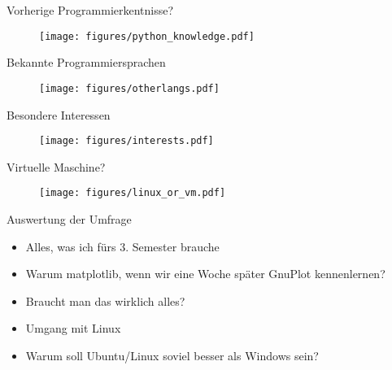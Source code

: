 \begin{frame}{Vorherige Programmierkentnisse?}
    \begin{figure}
        \centering
        \texttt{[image: figures/python\_knowledge.pdf]}
    \end{figure}
\end{frame}
\begin{frame}{Bekannte Programmiersprachen}
    \begin{figure}
        \centering
        \texttt{[image: figures/otherlangs.pdf]}
    \end{figure}
\end{frame}
\begin{frame}{Besondere Interessen}
    \begin{figure}
        \centering
        \texttt{[image: figures/interests.pdf]}
    \end{figure}
\end{frame}
\begin{frame}{Virtuelle Maschine?}
    \begin{figure}
        \centering
        \texttt{[image: figures/linux\_or\_vm.pdf]}
    \end{figure}
\end{frame}
\begin{frame}{Auswertung der Umfrage}
    \begin{itemize}
        \item Alles, was ich fürs 3. Semester brauche
        \item Warum matplotlib, wenn wir eine Woche später GnuPlot kennenlernen?
        \item Braucht man das wirklich alles?
        \item Umgang mit Linux
        \item Warum soll Ubuntu/Linux soviel besser als Windows sein?
    \end{itemize}
\end{frame}

